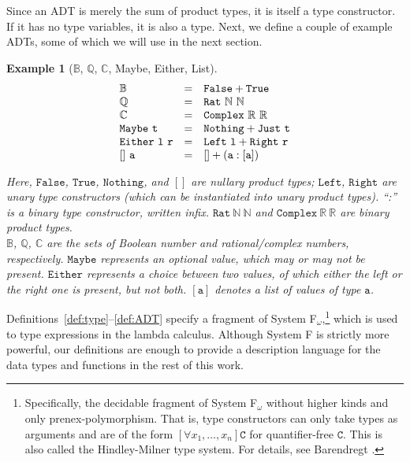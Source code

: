 \documentclass[]{scrartcl}
\theoremstyle{break}
\newtheorem{example}{Example}
\newcommand{\N}{\mathbb{N}}
\newcommand{\Q}{\mathbb{Q}}
\newcommand{\R}{\mathbb{R}}
\newcommand{\B}{\mathbb{B}}
\newcommand{\C}{\mathbb{C}}
\newcommand{\allQ}[1]{\left[\forall #1 \right]}
\newcommand{\type}[1]{\mathtt{#1}}
\newcommand{\lp}{{\rm (}}
\newcommand{\rp}{{\rm )}}
\newcommand{\paren}[1]{\lp{#1}\rp}
\begin{document}
Since an ADT is merely the sum of product types, it is itself a type constructor. If it has no type variables, it is also a type. Next, we define a couple of example ADTs, some of which we will use in the next section.

\begin{example}[$\B$, $\Q$, $\C$,  Maybe, Either, List]
	$$
		\begin{array}{l c l}
			\B & = & \type{False + True}\\
			\Q & = & \type{Rat}\ \N\ \N\\
			\C & = & \type{Complex}\ \R\ \R\\
			\type{Maybe\ t} & = & \type{Nothing + Just\ t}\\
			\type{Either\ l\ r} & = & \type{Left\ l + Right\ r}\\
			\type{[]\ a} & = & \type{[] + (a : [a])}\\
		\end{array}
	$$
	
	Here, $\type{False}$, $\type{True}$, $\type{Nothing}$, and $\type{[]}$ are nullary product types; $\type{Left}$, $\type{Right}$ are unary type constructors \paren{which can be instantiated into unary product types}. ``:'' is a binary type constructor, written infix. $\type{Rat}\ \N\ \N$ and $\type{Complex}\ \R\ \R$ are binary product types.\\
	
	$\B$, $\Q$, $\C$ are the sets of Boolean number and rational/complex numbers, respectively. $\mathtt{Maybe}$ represents an optional value, which may or may not be present. $\mathtt{Either}$ represents a choice between two values, of which either the left or the right one is present, but not both. $\type{[a]}$ denotes a list of values of type $\type{a}$.
\end{example}

Definitions~\ref{def:type}--\ref{def:ADT} specify a fragment of System F$_\omega$,\footnote{Specifically, the decidable fragment of System F$_\omega$ without higher kinds and only prenex-polymorphism. That is, type constructors can only take types as arguments and are of the form $\allQ{x_1,\dots,x_n} \type{C}$ for quantifier-free $\type{C}$. This is also called the Hindley-Milner type system. For details, see Barendregt \cite{barendregt91}.} which is used to type expressions in the lambda calculus. Although System F is strictly more powerful, our definitions are enough to provide a description language for the data types and functions in the rest of this work.
\end{document}
